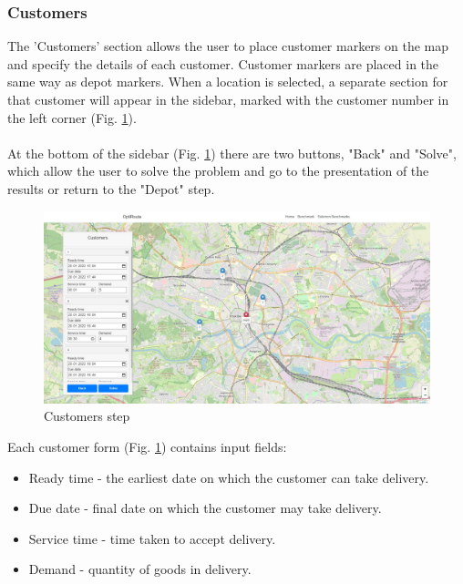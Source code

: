 \documentclass[a4paper,twoside,12pt]{book}
\begin{document}
\paragraph{}

\subsubsection{Customers}

The 'Customers' section allows the user to place customer markers on the map and specify the details of each customer. Customer markers are placed in the same way as depot markers. When a location is selected, a separate section for that customer will appear in the sidebar, marked with the customer number in the left corner (Fig. \ref{fig:customers}). 

\paragraph{}

At the bottom of the sidebar (Fig. \ref{fig:customers}) there are two buttons, "Back" and "Solve", which allow the user to solve the problem and go to the presentation of the results or return to the "Depot" step.

\begin{figure}[H]
\centering
\includegraphics[scale=0.3]{images/customers.jpg}
\caption{Customers step}
\label{fig:customers}
\end{figure}

Each customer form (Fig. \ref{fig:customers}) contains input fields:
\begin{itemize}
    \item Ready time - the earliest date on which the customer can take delivery.
    \item Due date - final date on which the customer may take delivery.
    \item Service time - time taken to accept delivery.
    \item Demand - quantity of goods in delivery.
\end{itemize}
\end{document}

